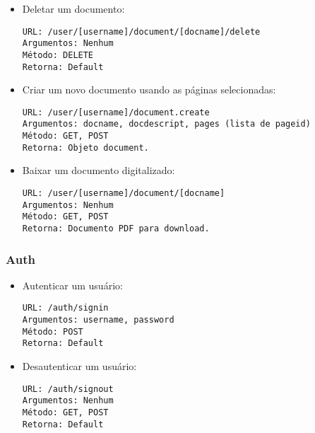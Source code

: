 \begin{itemize}
\item Deletar um documento: 
\begin{verbatim}
URL: /user/[username]/document/[docname]/delete
Argumentos: Nenhum
Método: DELETE
Retorna: Default 
\end{verbatim}

\item Criar um novo documento usando as páginas selecionadas:
\begin{verbatim}
URL: /user/[username]/document.create
Argumentos: docname, docdescript, pages (lista de pageid)
Método: GET, POST
Retorna: Objeto document.
\end{verbatim}

\item Baixar um documento digitalizado:
\begin{verbatim}
URL: /user/[username]/document/[docname]
Argumentos: Nenhum
Método: GET, POST
Retorna: Documento PDF para download.
\end{verbatim}

\end{itemize}

\subsubsection{Auth}

\begin{itemize}

\item Autenticar um usuário:
\begin{verbatim}
URL: /auth/signin
Argumentos: username, password
Método: POST
Retorna: Default
\end{verbatim}

\item Desautenticar um usuário:
\begin{verbatim}
URL: /auth/signout
Argumentos: Nenhum
Método: GET, POST
Retorna: Default
\end{verbatim} 

\end{itemize}
